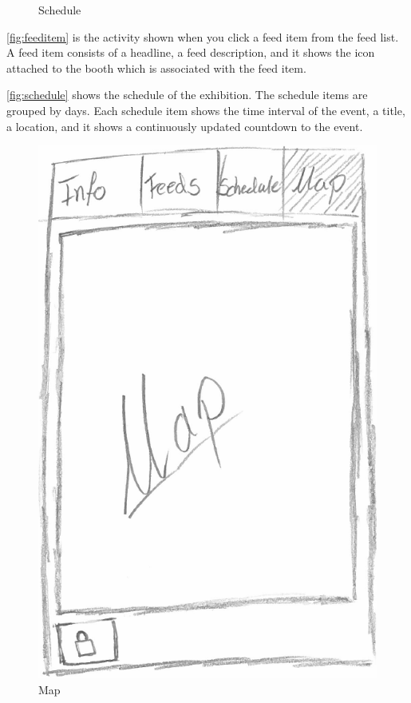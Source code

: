 \begin{figure}[H]
\begin{minipage}[b]{0.5\columnwidth}
\caption{Schedule\label{fig:schedule}}
\end{minipage}
\end{figure}

\autoref{fig:feeditem} is the activity shown when you click a feed item from the feed list. A feed item consists of a headline, a feed description, and it shows the icon attached to the booth which is associated with the feed item.

\autoref{fig:schedule} shows the schedule of the exhibition. The schedule items are grouped by days. Each schedule item shows the time interval of the event, a title, a location, and it shows a continuously updated countdown to the event.

\begin{figure}[H]
\begin{minipage}[b]{0.5\columnwidth}
\centering
\includegraphics[width=0.7\columnwidth]{img/prototype/7.png}
\caption{Map\label{fig:map}}
\end{minipage}
\hspace{0.5cm}
\begin{minipage}[b]{0.5\columnwidth}
\centering

\end{minipage}
\end{figure}
